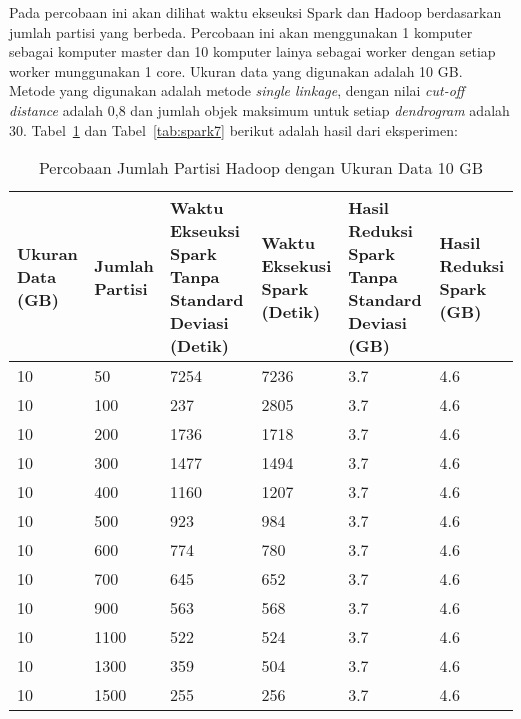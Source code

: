 


Pada percobaan ini akan dilihat waktu ekseuksi Spark dan Hadoop berdasarkan jumlah partisi yang berbeda. Percobaan ini akan menggunakan 1 komputer sebagai komputer master dan 10 komputer lainya sebagai worker dengan setiap worker munggunakan 1 core. Ukuran data yang digunakan adalah 10 GB. Metode yang digunakan adalah metode \textit{single linkage}, dengan nilai \textit{cut-off distance} adalah 0,8 dan jumlah objek maksimum untuk setiap \textit{dendrogram} adalah 30. Tabel~\ref{tab:spark6} dan Tabel~\ref{tab:spark7} berikut adalah hasil dari eksperimen:

\begin{table}[H] 
	\centering 
	\caption{Percobaan Jumlah Partisi Hadoop dengan Ukuran Data 10 GB}
	\label{tab:spark6}
	\begin{tabular}{|p{1cm}|p{1cm}|p{3cm}|p{3cm}|p{3cm}|p{3cm}|}
\hline
Ukuran Data (GB) & Jumlah Partisi &  Waktu Ekseuksi Spark Tanpa Standard Deviasi (Detik) & Waktu Eksekusi Spark (Detik) & Hasil Reduksi Spark Tanpa Standard Deviasi (GB) & Hasil Reduksi Spark (GB)  \\ 
\hline
10 & 50 & 7254 & 7236 & 3.7 & 4.6 \\
\hline
10 & 100 & 237 & 2805 &  3.7 & 4.6 \\
\hline
10 & 200 & 1736 & 1718 & 3.7 & 4.6 \\
\hline
10 & 300 & 1477 & 1494 & 3.7 & 4.6 \\
\hline
10 & 400 & 1160 & 1207 & 3.7 & 4.6 \\
\hline
10 & 500 & 923 & 984 &  3.7 & 4.6 \\
\hline
10 & 600 & 774 & 780 & 3.7 & 4.6 \\
\hline
10 & 700 & 645 & 652 & 3.7 & 4.6 \\
\hline
10 & 900 & 563 & 568 & 3.7 & 4.6 \\
\hline
10 & 1100 & 522 & 524 & 3.7 & 4.6 \\
\hline
10 & 1300 & 359 & 504 & 3.7 & 4.6 \\
\hline
10 & 1500 & 255 & 256 & 3.7 & 4.6 \\
\hline


\hline

	\end{tabular} 
\end{table}



